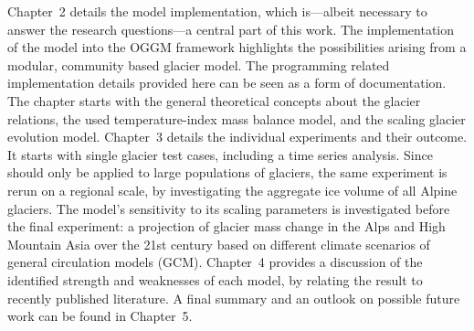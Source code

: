     Chapter~2 details the model implementation, which is---albeit necessary to answer the research questions---a central part of this work. The implementation of the \vas{} model into the OGGM framework highlights the possibilities arising from a modular, community based glacier model. The programming related implementation details provided here can be seen as a form of documentation. The chapter starts with the general theoretical concepts about the glacier \vas{} relations, the used temperature-index mass balance model, and the scaling glacier evolution model.
    Chapter~3 details the individual experiments and their outcome. It starts with single glacier test cases, including a time series analysis. Since \vas{} should only be applied to large populations of glaciers, the same experiment is rerun on a regional scale, by investigating the aggregate ice volume of all Alpine glaciers. The model's sensitivity to its scaling parameters is investigated before the final experiment: a projection of glacier mass change in the Alps and High Mountain Asia over the 21st century based on different climate scenarios of general circulation models (GCM).
    Chapter~4 provides a discussion of the identified strength and weaknesses of each model, by relating the result to recently published literature. A final summary and an outlook on possible future work can be found in Chapter~5.

